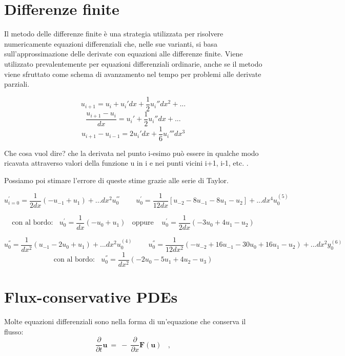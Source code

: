 %
%
\vspace{1cm}
\section{Differenze finite}

Il metodo delle differenze finite è una strategia utilizzata per risolvere numericamente equazioni differenziali che, nelle sue varianti, si basa sull'approssimazione delle derivate con equazioni alle differenze finite. Viene utilizzato prevalentemente per equazioni differenziali ordinarie, anche se il metodo viene sfruttato come schema di avanzamento nel tempo per problemi alle derivate parziali.

\[ u_{i+1}=u_i + u_i'dx + \frac{1}{2}u_i''dx^2 + ...  \]
\[ \frac{u_{i+1}-u_i}{dx}= u_i' + \frac{1}{2}u_i''dx + ...  \]
\[ u_{i+1}-u_{i-1} = 2u_i' dx + \frac{1}{6} u_i'''dx^3 \]

Che cosa vuol dire? che la derivata nel punto i-esimo può essere in qualche modo ricavata attraverso valori della funzione u in i e nei punti vicini i+1, i-1, etc. .

Possiamo poi stimare l'errore di queste stime grazie alle serie di Taylor.

\[ u_{i=0}^{'} = \frac{1}{2dx} \left(- u_{-1} +u_1 \right) + ...dx^2 u_0^{'''}\ \ \ \ \ \ \ \ \ \ u_{0}^{'} = \frac{1}{12dx} \left[ u_{-2} - 8u_{-1} -  8u_1 - u_2\right]+ ...dx^4u_0^{(5)} \]

\[ \text{con al bordo:}\ \ \ \ u^{'}_{0} = \frac{1}{dx} \left( -u_{0}+u_{1} \right) \ \ \ \ \text{oppure} \ \ \ \ \ u^{'}_{0}=\frac{1}{2dx} (-3u_0 + 4u_1 - u_2) \]

\[ u_{0}^{''} = \frac{1}{dx^2} \left(u_{-1} -2u_0 + u_1 \right) + ...dx^2 u_0^{(4)}\ \ \ \ \ \ \ \ \ \ u_{0}^{''} = \frac{1}{12dx^2} \left( -u_{-2} +16u_{-1} -30u_0 + 16u_1 -u_2\right) + ...dx^2y_0^{(6)} \]
\[ \text{con al bordo:}\ \ \ \  u^{''}_{0}=\frac{1}{dx^2} (-2u_0 -5u_{1}+4 u_2-u_3) \]



%
%
\vspace{1cm}
\section{Flux-conservative PDEs}
Molte equazioni differenziali sono nella forma di un'equazione che conserva il flusso:
\begin{equation}
	\boxed{\frac{\partial}{\partial t}\textbf{u}\ =\ -\ \frac{\partial}{\partial x}\textbf{F}(\textbf{u})}\ \ \ \ ,
\end{equation}


